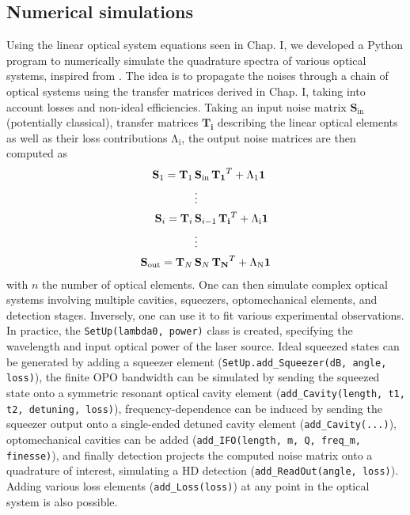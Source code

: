 \subsection{Numerical simulations}
Using the linear optical system equations seen in Chap. I, we developed a Python program to numerically simulate the quadrature spectra of various optical systems, inspired from \cite{Oelker2016PhD,evans_realistic_2013,kwee_decoherence_2014,Isogai2016PhD}. The idea is to propagate the noises through a chain of optical systems using the transfer matrices derived in Chap. I, taking into account losses and non-ideal efficiencies. Taking an input noise matrix $ \mathbf{S}_\text{in}$ (potentially classical), transfer matrices $\mathbf{T_i}$ describing the linear optical elements as well as their loss contributions $\mathrm{\Lambda_i}$, the output noise matrices are then computed as
\begin{equation}
\begin{split}
  \mathbf{S}_{1}  = \mathbf{T}_{1} \, &\mathbf{S}_{\rm in} \, \mathbf{T_1}^T + \mathrm{\Lambda_1} \mathbf{1}\\
   &\vdots \\  
  \mathbf{S}_{i}  = \mathbf{T}_{i} \, &\mathbf{S}_{i-1} \, \mathbf{T_i}^T + \mathrm{\Lambda_i} \mathbf{1} \\
   &\vdots \\ 
  \mathbf{S}_{\rm out}  = \mathbf{T}_{N} \, &\mathbf{S}_{N} \, \mathbf{T_N}^T + \mathrm{\Lambda_N} \mathbf{1} \\
\end{split}
\end{equation}
with $n$ the number of optical elements. One can then simulate complex optical systems involving multiple cavities, squeezers, optomechanical elements, and detection stages. Inversely, one can use it to fit various experimental observations. \\

In practice, the \texttt{SetUp(lambda0, power)} class is created, specifying the wavelength and input optical power of the laser source. Ideal squeezed states can be generated by adding a squeezer element (\texttt{SetUp.add\_Squeezer(dB, angle, loss)}), the finite OPO bandwidth can be simulated by sending the squeezed state onto a symmetric resonant optical cavity element (\texttt{add\_Cavity(length, t1, t2, detuning, loss)}), frequency-dependence can be induced by sending the squeezer output onto a single-ended detuned cavity element (\texttt{add\_Cavity(...)}), optomechanical cavities can be added (\texttt{add\_IFO(length, m, Q, freq\_m, finesse)}), and finally detection projects the computed noise matrix onto a quadrature of interest, simulating a HD detection (\texttt{add\_ReadOut(angle, loss)}). Adding various loss elements (\texttt{add\_Loss(loss)}) at any point in the optical system is also possible. \\ 

